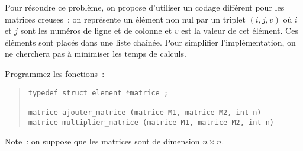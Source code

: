 Pour résoudre ce problème, on propose d'utiliser un codage différent
pour les matrices creuses~:  on représente un élément non nul par un
triplet $(i, j, v)$ où $i$ et $j$ sont les numéros de ligne et de
colonne et $v$ est la valeur de cet élément.  Ces éléments sont placés
dans une liste chaînée. Pour simplifier l'implémentation, on ne
cherchera pas à minimiser les temps de calculs.

Programmez les fonctions~:

\begin {quote}
\begin {verbatim}
typedef struct element *matrice ;

matrice ajouter_matrice (matrice M1, matrice M2, int n)
matrice multiplier_matrice (matrice M1, matrice M2, int n)
\end{verbatim}
\end {quote}

Note~: on suppose que les matrices sont de dimension $n \times n$.


